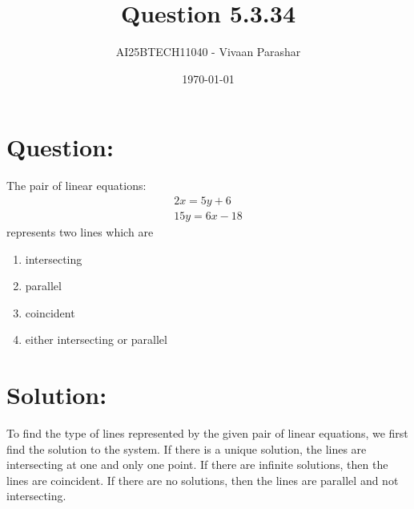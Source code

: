 \documentclass[a4paper, 12pt]{article}
\title{Question 5.3.34}
\author{AI25BTECH11040 - Vivaan Parashar}
\date{\today}
\begin{document}
\maketitle

\section{Question: }
The pair of linear equations:
\begin{align*}
    2x = 5y + 6\\
    15y = 6x - 18
\end{align*}
represents two lines which are
\begin{enumerate}
    \item intersecting
    \item parallel
    \item coincident
    \item either intersecting or parallel
\end{enumerate}

\section{Solution: }
To find the type of lines represented by the given pair of linear equations, we first find the solution to the system. If there is a unique solution, the lines are intersecting at one and only one point. If there are infinite solutions, then the lines are coincident. If there are no solutions, then the lines are parallel and not intersecting.
\end{document}
